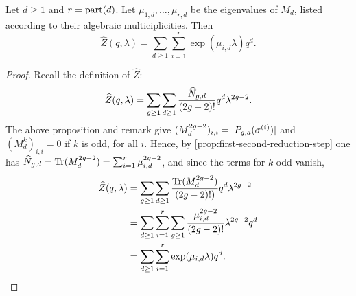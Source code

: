 \begin{lemma} \label{prop:counting-fct}
 Let $d\geq 1$ and $r=\operatorname{part}(d)$. Let $\mu_{1,d},\dotsc,\mu_{r,d}$ be the eigenvalues of $M_d$, listed according to their algebraic multiciplicities. Then
 \[
  \widehat{Z}(q,\lambda)=\sum_{d\geq1}\sum_{i=1}^r \exp(\mu_{i,d}\lambda)q^d.
 \]
\end{lemma}
\begin{proof}
 Recall the definition of $\widehat{Z}$:
 \[\widehat{Z}(q,\lambda) = \sum_{g\geq 1}\sum_{d\geq 1} \frac{\widehat{N}_{g,d}}{(2g-2)!}q^d\lambda^{2g-2}.\]
 The above proposition and remark give $(M_d^{2g-2})_{i,i}=|P_{g,d}(\sigma^{(i)})|$ and $(M_d^k)_{i,i}=0$ if $k$ is odd, for all $i$. Hence, by \ref{prop:first-second-reduction-step} one has $\widehat{N}_{g,d}=\operatorname{Tr}(M_d^{2g-2})=\sum_{i=1}^r \mu_{i,d}^{2g-2}$, and since the terms for $k$ odd vanish,
 \begin{align*}
  \widehat{Z}(q,\lambda)&=\sum_{g\geq1}\sum_{d\geq1}\frac{\operatorname{Tr}(M^{2g-2}_d)}{(2g-2)!)}q^d\lambda^{2g-2}\\
  &=\sum_{d\geq1}\sum_{i=1}^r\sum_{g\geq1}\frac{\mu_{i,d}^{2g-2}}{(2g-2)!}\lambda^{2g-2}q^d\\
  &=\sum_{d\geq1}\sum_{i=1}^r \exp(\mu_{i,d}\lambda)q^d.
 \end{align*}
\end{proof}